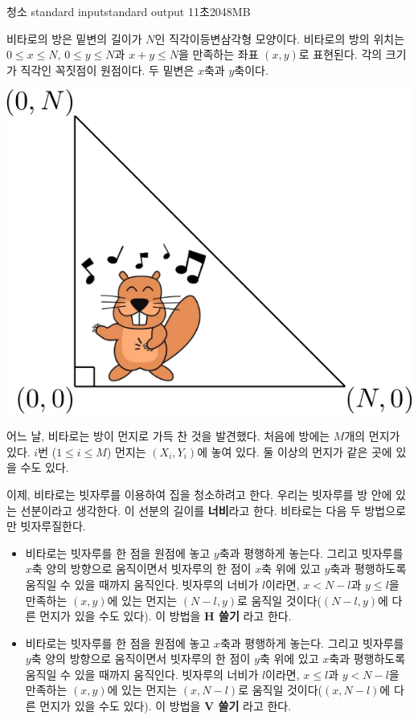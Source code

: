 \begin{problem}{청소}
	{standard input}{standard output}
	{11초}{2048MB}{}
	
	비타로의 방은 밑변의 길이가 $N$인 직각이등변삼각형 모양이다. 비타로의 방의 위치는 $0 \le x \le N$, $0 \le y \le N$과 $x+y \le N$을 만족하는 좌표 $(x, y)$로 표현된다. 각의 크기가 직각인 꼭짓점이 원점이다. 두 밑변은 $x$축과 $y$축이다.
	
	\begin{center}
		\includegraphics[width=0.5\linewidth]{img1.png}
	\end{center}
	
	
	
	어느 날, 비타로는 방이 먼지로 가득 찬 것을 발견했다. 처음에 방에는 $M$개의 먼지가 있다. $i$번 ($1 \le i \le M$) 먼지는 $(X_i, Y_i)$에 놓여 있다. 둘 이상의 먼지가 같은 곳에 있을 수도 있다.
	
	이제, 비타로는 빗자루를 이용하여 집을 청소하려고 한다. 우리는 빗자루를 방 안에 있는 선분이라고 생각한다. 이 선분의 길이를 \textbf{너비}라고 한다. 비타로는 다음 두 방법으로만 빗자루질한다.
	
	
	\begin{itemize}
		\item 비타로는 빗자루를 한 점을 원점에 놓고 $y$축과 평행하게 놓는다. 그리고 빗자루를 $x$축 양의 방향으로 움직이면서 빗자루의 한 점이 $x$축 위에 있고 $y$축과 평행하도록 움직일 수 있을 때까지 움직인다. 빗자루의 너비가 $l$이라면, $x<N-l$과 $y \le l$을 만족하는 $(x, y)$에 있는 먼지는 $(N-l, y)$로 움직일 것이다($(N-l, y)$에 다른 먼지가 있을 수도 있다). 이 방법을 \textbf{H 쓸기} 라고 한다.
		
		\item 비타로는 빗자루를 한 점을 원점에 놓고 $x$축과 평행하게 놓는다. 그리고 빗자루를 $y$축 양의 방향으로 움직이면서 빗자루의 한 점이 $y$축 위에 있고 $x$축과 평행하도록 움직일 수 있을 때까지 움직인다. 빗자루의 너비가 $l$이라면, $x\le l$과 $y < N-l$을 만족하는 $(x, y)$에 있는 먼지는 $(x, N-l)$로 움직일 것이다($(x, N-l)$에 다른 먼지가 있을 수도 있다). 이 방법을 \textbf{V 쓸기} 라고 한다.
	\end{itemize}
	

\end{problem}
